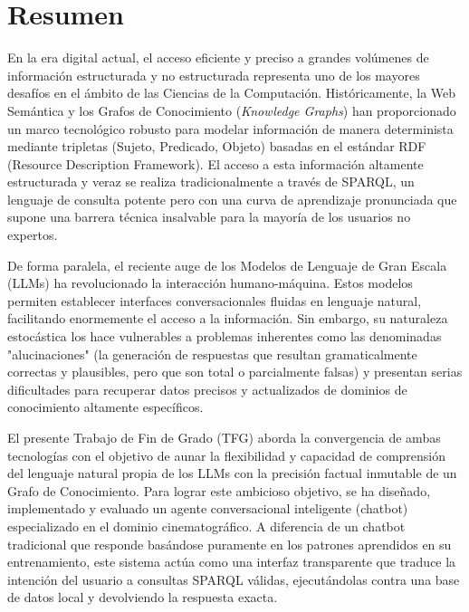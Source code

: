 

\chapter*{Resumen}

En la era digital actual, el acceso eficiente y preciso a grandes volúmenes de información estructurada y no estructurada representa uno de los mayores desafíos en el ámbito de las Ciencias de la Computación. Históricamente, la Web Semántica y los Grafos de Conocimiento (\textit{Knowledge Graphs}) han proporcionado un marco tecnológico robusto para modelar información de manera determinista mediante tripletas (Sujeto, Predicado, Objeto) basadas en el estándar RDF (Resource Description Framework). El acceso a esta información altamente estructurada y veraz se realiza tradicionalmente a través de SPARQL, un lenguaje de consulta potente pero con una curva de aprendizaje pronunciada que supone una barrera técnica insalvable para la mayoría de los usuarios no expertos.

De forma paralela, el reciente auge de los Modelos de Lenguaje de Gran Escala (LLMs) ha revolucionado la interacción humano-máquina. Estos modelos permiten establecer interfaces conversacionales fluidas en lenguaje natural, facilitando enormemente el acceso a la información. Sin embargo, su naturaleza estocástica los hace vulnerables a problemas inherentes como las denominadas "alucinaciones" (la generación de respuestas que resultan gramaticalmente correctas y plausibles, pero que son total o parcialmente falsas) y presentan serias dificultades para recuperar datos precisos y actualizados de dominios de conocimiento altamente específicos.

El presente Trabajo de Fin de Grado (TFG) aborda la convergencia de ambas tecnologías con el objetivo de aunar la flexibilidad y capacidad de comprensión del lenguaje natural propia de los LLMs con la precisión factual inmutable de un Grafo de Conocimiento. Para lograr este ambicioso objetivo, se ha diseñado, implementado y evaluado un agente conversacional inteligente (chatbot) especializado en el dominio cinematográfico. A diferencia de un chatbot tradicional que responde basándose puramente en los patrones aprendidos en su entrenamiento, este sistema actúa como una interfaz transparente que traduce la intención del usuario a consultas SPARQL válidas, ejecutándolas contra una base de datos local y devolviendo la respuesta exacta.

